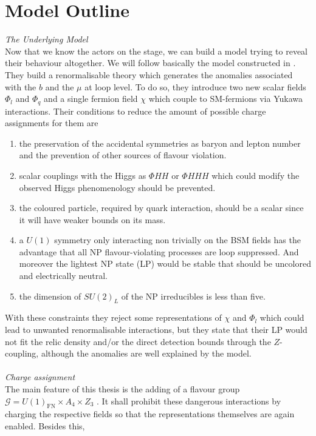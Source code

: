 \section{Model Outline}
\textit{The Underlying Model}\\
\noindent Now that we know the actors on the stage, we can build a model trying to reveal their behaviour altogether. We will follow basically the model constructed
in \cite{Grip}. They build a renormalisable theory which generates the anomalies associated with the $b$ and the $\mu$ at loop level. To do so, they 
introduce two new scalar fields $\Phi_l$ and $\Phi_q$ and a single fermion field $\chi$ which couple to SM-fermions via Yukawa interactions. 
Their conditions to reduce the amount of possible charge assignments for them are 
\begin{enumerate}
 \item the preservation of the accidental symmetries as baryon and lepton number and the prevention of other sources of flavour violation.
 \item scalar couplings with the Higgs as $\Phi H H$ or $\Phi H H H$ which could modify the observed Higgs phenomenology should be prevented.
 \item the coloured particle, required by quark interaction, should be a scalar since it will have weaker bounds on its mass.
 \item a $U(1)$ symmetry only interacting non trivially on the BSM fields has the advantage that all NP flavour-violating processes are loop suppressed. And
 moreover the lightest NP state (LP) would be stable that should be uncolored and electrically neutral. 
 \item the dimension of $SU(2)_L$ of the NP irreducibles is less than five.
\end{enumerate}
With these constraints they reject some representations of $\chi$ and $\Phi_l$ which could lead to unwanted renormalisable interactions, but they state 
that their LP would not fit the relic density and/or the direct detection bounds through the $Z$-coupling, although the anomalies are 
well explained by the model. \\ \\
\noindent \textit{Charge assignment}\\ \noindent
The main feature of this thesis is the adding of a flavour group $\mathcal{G} = U(1)_\text{FN}\times A_4 \times Z_3$ \cite{FerA4}\cite{VarzTotMod}. 
It shall prohibit these dangerous interactions by charging the respective fields so that the representations themselves are again enabled. Besides this,
